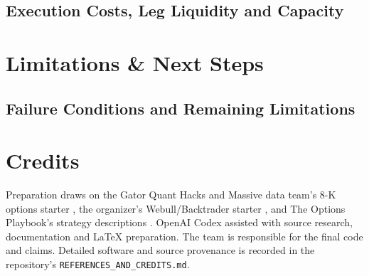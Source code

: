 \documentclass[11pt,letterpaper]{article}
\begin{document}
\subsection{Execution Costs, Leg Liquidity and Capacity}

\section{Limitations \& Next Steps}
\subsection{Failure Conditions and Remaining Limitations}

\section*{Credits}
Preparation draws on the Gator Quant Hacks and Massive data team's 8-K
options starter \cite{massive-starter}, the organizer's Webull/Backtrader
starter \cite{webull-starter}, and The Options Playbook's strategy
descriptions \cite{options-playbook}. OpenAI Codex assisted with source
research, documentation and LaTeX preparation. The team is responsible for
the final code and claims. Detailed software and source provenance is
recorded in the repository's \texttt{REFERENCES\_AND\_CREDITS.md}.
\end{document}
